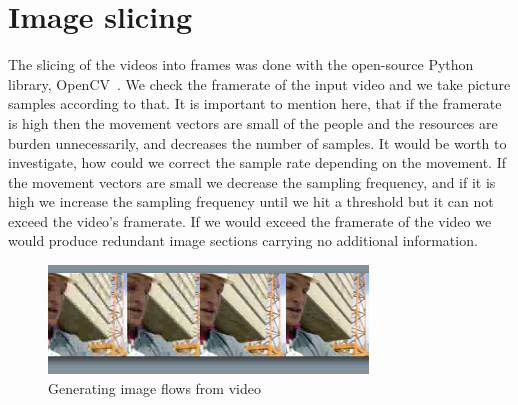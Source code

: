 \section{Image slicing}

The slicing of the videos into frames was done with the open-source Python library, OpenCV~\cite{opencv}. We check the framerate of the input video and we take picture samples according to that. It is important to mention here, that if the framerate is high then the movement vectors are small of the people and the resources are burden unnecessarily, and decreases the number of samples. It would be worth to investigate, how could we correct the sample rate depending on the movement. If the movement vectors are small we decrease the sampling frequency, and if it is high we increase the sampling frequency until we hit a threshold but it can not exceed the video's framerate. If we would exceed the framerate of the video we would produce redundant image sections carrying no additional information.

\begin{figure}[!ht]
\centering
\includegraphics[width=85mm,keepaspectratio]{fig/h246_composite.png}
\caption{Generating image flows from video}
\label{fig:image_slicing} 
\end{figure}

